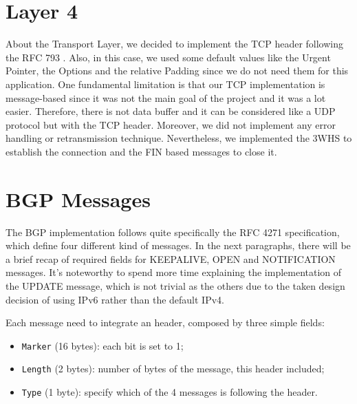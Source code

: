 \section{Layer 4}\label{layer4}
About the Transport Layer, we decided to implement the TCP header following the RFC 793 \cite{rfc793}.
Also, in this case, we used some default values like the Urgent Pointer, the Options and the relative Padding since we do not need them for this application.\newline
One fundamental limitation is that our TCP implementation is message-based since it was not the main goal of the project and it was a lot easier.
Therefore, there is not data buffer and it can be considered like a UDP protocol but with the TCP header.
Moreover, we did not implement any error handling or retransmission technique.\newline
Nevertheless, we implemented the 3WHS to establish the connection and the FIN based messages to close it.

\section{BGP Messages}\label{BGPMex}
The BGP implementation follows quite specifically the RFC 4271 specification, which define four different kind of messages.
In the next paragraphs, there will be a brief recap of required fields for KEEPALIVE, OPEN and NOTIFICATION messages. It's noteworthy to spend more time explaining the implementation of the UPDATE message, which is not trivial as the others due to the taken design decision of using IPv6 rather than the default IPv4.

Each message need to integrate an header, composed by three simple fields:
\begin{itemize}
 \item \texttt{Marker} (16 bytes): each bit is set to 1;
 \item \texttt{Length} (2 bytes): number of bytes of the message, this header included;
 \item \texttt{Type} (1 byte): specify which of the 4 messages is following the header.
\end{itemize}

